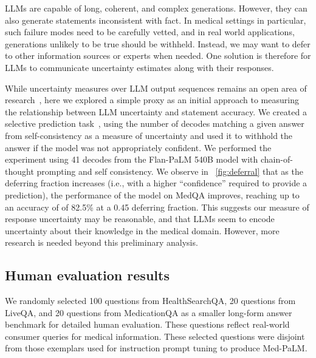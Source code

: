 \documentclass[10pt, letter, onecolumn]{arxiv}
\begin{document}
\begin{refsection}
LLMs are capable of long, coherent, and complex generations. However, they can also generate statements inconsistent with fact. In medical settings in particular, such failure modes need to be carefully vetted, and in real world applications, generations unlikely to be true should be withheld. Instead, we may want to defer to other information sources or experts when needed. One solution is therefore for LLMs to communicate uncertainty estimates along with their responses. 

While uncertainty measures over LLM output sequences remains an open area of research~\cite{kadavath2022language, lin2022teaching}, here we explored a simple proxy as an initial approach to measuring the relationship between LLM uncertainty and statement accuracy. We created a selective prediction task~\cite{tran2022plex}, using the number of decodes matching a given answer from self-consistency as a measure of uncertainty and used it to withhold the answer if the model was not appropriately confident. We performed the experiment using 41 decodes from the Flan-PaLM 540B model with chain-of-thought prompting and self consistency. We observe in ~\ref{fig:deferral} that as the deferring fraction increases (i.e., with a higher “confidence” required to provide a prediction), the performance of the model on MedQA improves, reaching up to an accuracy of of 82.5\% at a 0.45 deferring fraction. This suggests our measure of response uncertainty may be reasonable, and that LLMs seem to encode uncertainty about their knowledge in the medical domain. However, more research is needed beyond this preliminary analysis.

\subsection{Human evaluation results}
\label{sec:human_evaluation_results}

We randomly selected 100 questions from HealthSearchQA, 20 questions from LiveQA, and 20 questions from MedicationQA as a smaller long-form answer benchmark for detailed human evaluation. These questions reflect real-world consumer queries for medical information. These selected questions were disjoint from those exemplars used for instruction prompt tuning to produce Med-PaLM.


\end{refsection}
\end{document}
